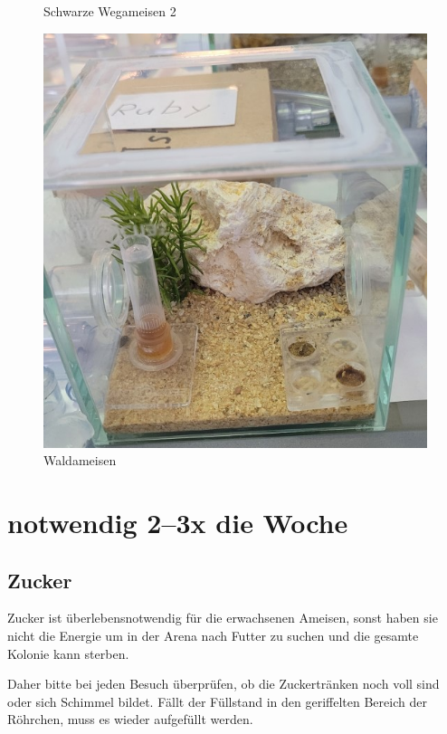 \begin{figure}[H]
\begin{minipage}{.5\textwidth}
    \caption[Wegameisen2]{Schwarze Wegameisen 2}
  \end{minipage}
\end{figure}
\begin{figure}[H]
  \begin{minipage}{.5\textwidth}
    \centering
    \includegraphics[width=.8\linewidth]{resources/F-rufibarbis.jpg}
    \caption[Waldameisen]{Waldameisen}
  \end{minipage}%
  \begin{minipage}{.5\textwidth}
  \end{minipage}
\end{figure}

\section{notwendig 2--3x die Woche}

\subsection{Zucker}
Zucker ist überlebensnotwendig für die erwachsenen Ameisen,
sonst haben sie nicht die Energie um in der Arena nach Futter zu suchen und die gesamte Kolonie kann sterben.

Daher bitte bei jeden Besuch überprüfen, ob die Zuckertränken noch voll sind oder sich Schimmel bildet.
Fällt der Füllstand in den geriffelten Bereich der Röhrchen,
muss es wieder aufgefüllt werden.

